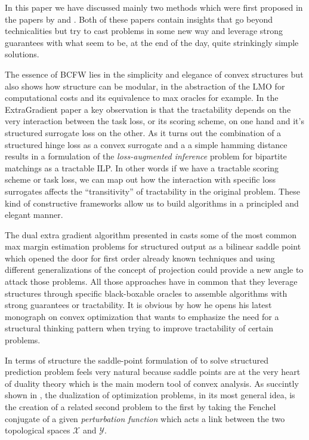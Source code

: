 In this paper we have discussed mainly two methods which were first proposed in
the papers by \citet{taskarStructuredPredictionDual2006} and
\citet{lacoste-julienBlockCoordinateFrankWolfeOptimization2013}. Both of these
papers contain insights that go beyond technicalities but try to cast problems
in some new way and leverage strong guarantees with what seem to be, at the end
of the day, quite strinkingly simple solutions.

The essence of BCFW lies in the simplicity and elegance of convex structures but
also shows how structure can be modular, in the abstraction of the LMO for
computational costs and its equivalence to max oracles for example. In the
ExtraGradient paper a key observation is that the tractability depends on the
very interaction between the task loss, or its scoring scheme, on one hand and
it's structured surrogate loss on the other. As it turns out the combination of
a structured hinge loss as a convex surrogate and a a simple hamming distance
results in a formulation of the \emph{loss-augmented inference} problem for
bipartite matchings as a tractable ILP. In other words if we have a tractable
scoring scheme or task loss, we can map out how the interaction with specific
loss surrogates affects the ``transitivity'' of tractability in the original
problem. These kind of constructive frameworks allow us to build algorithms in a
principled and elegant manner.

The dual extra gradient algorithm presented in
\citet{taskarStructuredPredictionDual2006} casts some of the most common max
margin estimation problems for structured output as a bilinear saddle point
which opened the door for first order already known techniques and using
different generalizations of the concept of projection could provide a new angle
to attack those problems. All those approaches have in common that they leverage
structures through specific black-boxable oracles to assemble algorithms with
strong guarantees or tractability. It is obvious by how he opens his latest
monograph on convex optimization that
\citet{nesterovLecturesConvexOptimization2018} wants to emphasize the need for a
structural thinking pattern when trying to improve tractability of certain
problems.


In terms of structure the saddle-point formulation of
\citet{taskarStructuredPredictionDual2006} to solve structured prediction
problem feels very natural because saddle points are at the very heart of
duality theory which is the main modern tool of convex analysis. As succintly
shown in \cite{botConjugateDualityConvex2010}, the dualization of optimization
problems, in its most general idea, is the creation of a related second problem
to the first by taking the Fenchel conjugate of a given \emph{perturbation
function} which acts a link between the two topological spaces $\mathcal X$ and
$\mathcal Y$.

